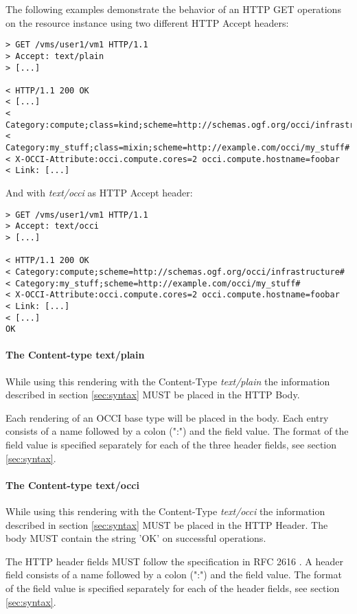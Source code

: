 \documentclass[10pt,a4paper]{article}
\begin{document}
The following examples demonstrate the behavior of an HTTP GET
operations on the resource instance \emph{} using two different HTTP
Accept headers:

\begin{verbatim}
> GET /vms/user1/vm1 HTTP/1.1
> Accept: text/plain
> [...]
 
< HTTP/1.1 200 OK
< [...]
< Category:compute;class=kind;scheme=http://schemas.ogf.org/occi/infrastructure#
< Category:my_stuff;class=mixin;scheme=http://example.com/occi/my_stuff#
< X-OCCI-Attribute:occi.compute.cores=2 occi.compute.hostname=foobar
< Link: [...]
\end{verbatim}

And with \emph{text/occi} as HTTP Accept header:

\begin{verbatim}
> GET /vms/user1/vm1 HTTP/1.1
> Accept: text/occi
> [...]
 
< HTTP/1.1 200 OK
< Category:compute;scheme=http://schemas.ogf.org/occi/infrastructure#
< Category:my_stuff;scheme=http://example.com/occi/my_stuff#
< X-OCCI-Attribute:occi.compute.cores=2 occi.compute.hostname=foobar
< Link: [...]
< [...]
OK
\end{verbatim}

\paragraph{The Content-type text/plain}
While using this rendering with the Content-Type \textit{text/plain}
the information described in section \ref{sec:syntax} MUST be placed
in the HTTP Body.

Each rendering of an OCCI base type will be placed in the body. Each
entry consists of a name followed by a colon (":") and the field
value. The format of the field value is specified separately for each
of the three header fields, see section \ref{sec:syntax}.

\paragraph{The Content-type text/occi}
While using this rendering with the Content-Type \textit{text/occi}
the information described in section \ref{sec:syntax} MUST be placed
in the HTTP Header. The body MUST contain the string 'OK' on
successful operations.

The HTTP header fields MUST follow the specification in RFC 2616
\cite{rfc2616}. A header field consists of a name followed by a colon
(":") and the field value. The format of the field value is specified
separately for each of the header fields, see section
\ref{sec:syntax}.
\end{document}
